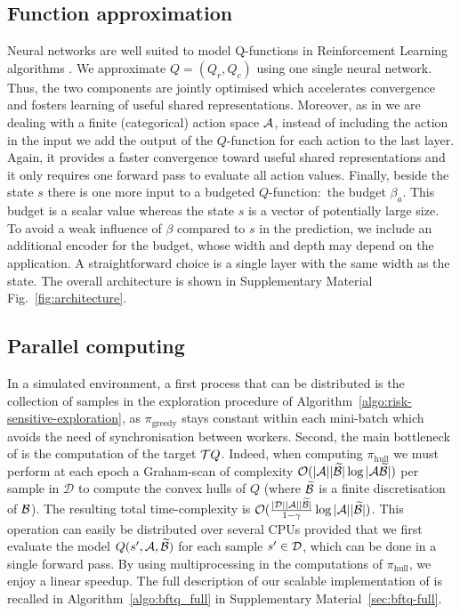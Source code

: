\documentclass{article}
\begin{document}
\subsection{Function approximation}

Neural networks are well suited to model Q-functions in Reinforcement Learning algorithms \citep{Riedmiller2005,Mnih2015}.  We approximate $Q = (Q_r, Q_c)$ using one single neural network. Thus, the two components are jointly optimised which accelerates convergence and fosters learning of useful shared representations. Moreover, as in \citep{Mnih2015} we are dealing with a finite (categorical) action space $\mathcal{A}$, instead of including the action in the input we add the output of the $Q$-function for each action to the last layer. Again, it provides a faster convergence toward useful shared representations and it only requires one forward pass to evaluate all action values. Finally, beside the state $s$ there is one more input to a budgeted $Q$-function:~the budget $\beta_a$. This budget is a scalar value whereas the state $s$ is a vector of potentially large size. To avoid a weak influence of $\beta$ compared to $s$ in the prediction, we include an additional encoder for the budget, whose width and depth may depend on the application. A straightforward choice is a single layer with the same width as the state. The overall architecture is shown in Supplementary Material Fig.~\ref{fig:architecture}.

\subsection{Parallel computing}

In a simulated environment, a first process that can be distributed is the collection of samples in the exploration procedure of Algorithm~\ref{algo:risk-sensitive-exploration}, as $\pi_\text{greedy}$ stays constant within each mini-batch which avoids the need of synchronisation between workers. Second, the main bottleneck of \BFTQ is the computation of the target $\mathcal{T} Q$. Indeed, when computing $\pi_\text{hull}$ we must perform at each epoch a Graham-scan of complexity $\mathcal{O}(|\mathcal{A}||\widetilde{\mathcal{B}}| \log |\mathcal{A}\widetilde{\mathcal{B}}|)$ per sample in $\mathcal{D}$ to compute the convex hulls of $Q$ (where $\widetilde{\mathcal{B}}$ is a finite discretisation of $\mathcal{B}$). The resulting total time-complexity is $\mathcal{O}(\frac{|\mathcal{D}||\mathcal{A}||\widetilde{\mathcal{B}}|}{1-\gamma} \log |\mathcal{A}||\widetilde{\mathcal{B}}|)$. This operation can easily be distributed over several CPUs provided that we first evaluate the model $Q(s',\mathcal{A},\widetilde{\mathcal{B}})$ for each sample $s'\in\mathcal{D}$, which can be done in a single forward pass. By using multiprocessing in the computations of $\pi_\text{hull}$, we enjoy a linear speedup.%
The full description of our scalable implementation of \BFTQ is recalled in Algorithm~\ref{algo:bftq_full} in Supplementary Material~\ref{sec:bftq-full}.
\end{document}
